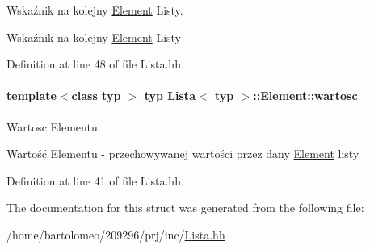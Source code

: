 Wskaźnik na kolejny \hyperlink{struct_lista_1_1_element}{Element} Listy. 

Wskaźnik na kolejny \hyperlink{struct_lista_1_1_element}{Element} Listy 

Definition at line 48 of file Lista.\-hh.

\hypertarget{struct_lista_1_1_element_ad870a2e351c1c851c2728cf7f3a5fcd4}{
\paragraph[{wartosc}]{\setlength{\rightskip}{0pt plus 5cm}template$<$class typ $>$ typ {\bf Lista}$<$ typ $>$\-::Element\-::wartosc}}\label{struct_lista_1_1_element_ad870a2e351c1c851c2728cf7f3a5fcd4}


Wartosc Elementu. 

Wartość Elementu -\/ przechowywanej wartości przez dany \hyperlink{struct_lista_1_1_element}{Element} listy 

Definition at line 41 of file Lista.\-hh.



The documentation for this struct was generated from the following file\-:\begin{DoxyCompactItemize}
\item 
/home/bartolomeo/209296/prj/inc/\hyperlink{_lista_8hh}{Lista.\-hh}\end{DoxyCompactItemize}
